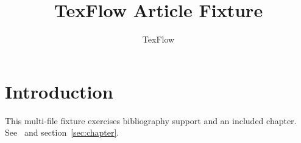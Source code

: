 \documentclass[11pt]{article}
\title{TexFlow Article Fixture}
\author{TexFlow}
\date{}
\begin{document}
\maketitle

\section{Introduction}
\label{sec:intro}
This multi-file fixture exercises bibliography support and an included chapter.
See~\cite{knuth1984} and section~\ref{sec:chapter}.





\end{document}
